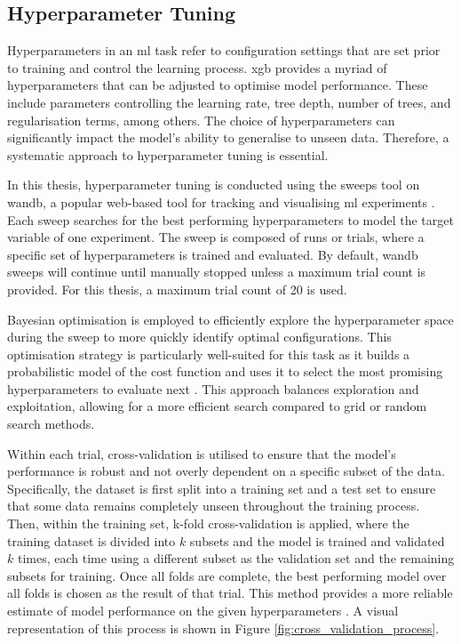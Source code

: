 \subsection{Hyperparameter Tuning}

Hyperparameters in an \acrshort{ml} task refer to configuration settings that are set prior to training and control the learning process. \acrshort{xgb} provides a myriad of hyperparameters that can be adjusted to optimise model performance. These include parameters controlling the learning rate, tree depth, number of trees, and regularisation terms, among others. The choice of hyperparameters can significantly impact the model's ability to generalise to unseen data. Therefore, a systematic approach to hyperparameter tuning is essential. 

In this thesis, hyperparameter tuning is conducted using the sweeps tool on \acrfull{wandb}, a popular web-based tool for tracking and visualising \acrshort{ml} experiments \citep{Biewald2020}. Each sweep searches for the best performing hyperparameters to model the target variable of one experiment. The sweep is composed of runs or trials, where a specific set of hyperparameters is trained and evaluated. By default, \acrshort{wandb} sweeps will continue until manually stopped unless a maximum trial count is provided. For this thesis, a maximum trial count of 20 is used.

Bayesian optimisation is employed to efficiently explore the hyperparameter space during the sweep to more quickly identify optimal configurations. This optimisation strategy is particularly well-suited for this task as it builds a probabilistic model of the cost function and uses it to select the most promising hyperparameters to evaluate next \citep{Mockus1994,Shahriari2016}. This approach balances exploration and exploitation, allowing for a more efficient search compared to grid or random search methods.

Within each trial, cross-validation is utilised to ensure that the model's performance is robust and not overly dependent on a specific subset of the data. Specifically, the dataset is first split into a training set and a test set to ensure that some data remains completely unseen throughout the training process. Then, within the training set, k-fold cross-validation is applied, where the training dataset is divided into $k$ subsets and the model is trained and validated $k$ times, each time using a different subset as the validation set and the remaining subsets for training. Once all folds are complete, the best performing model over all folds is chosen as the result of that trial. This method provides a more reliable estimate of model performance on the given hyperparameters \citep{Lopez2023,Singh2021}. A visual representation of this process is shown in Figure \ref{fig:cross_validation_process}.

